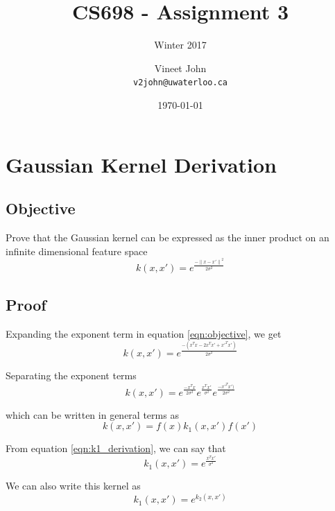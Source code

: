 \documentclass[parskip=full]{scrartcl}
\begin{document}
\title{CS698 - Assignment 3}
\subtitle{Winter 2017}
\author{
    Vineet John\\
    \texttt{v2john@uwaterloo.ca}
}
\date{\today}
\maketitle


\section{Gaussian Kernel Derivation} %
\label{sec:gaussian_kernel_derivation}

    \subsection*{Objective} %
    \label{sub:objective_1}
        Prove that the Gaussian kernel can be expressed as the inner product on an infinite dimensional feature space
        \begin{equation} \label{eqn:objective}
            k(x, x\prime) = e^{\frac{- {\lVert x - x\prime \rVert}^2}{2\sigma^2}}
        \end{equation}


    \subsection*{Proof} %
    \label{sub:proof_1}

        Expanding the exponent term in equation \ref{eqn:objective}, we get
        $$k(x, x\prime) = e^{\frac{-(x^Tx - 2x^Tx\prime + x\prime^Tx\prime)}{2\sigma^2}}$$

        Separating the exponent terms
        $$k(x, x\prime) = e^{\frac{-x^Tx}{2\sigma^2}} e^{\frac{x^Tx\prime}{\sigma^2}} e^{\frac{- x\prime^Tx\prime)}{2\sigma^2}}$$

        which can be written in general terms as
        \begin{equation} \label{eqn:k1_derivation}
            k(x, x\prime) = f(x) k_1(x, x\prime) f(x\prime)
        \end{equation}

        From equation \ref{eqn:k1_derivation}, we can say that
        $$k_1(x, x\prime) = e^{\frac{x^Tx\prime}{\sigma^2}} $$

        We can also write this kernel as 
        \begin{equation} \label{eqn:k2_derivation}
            k_1(x, x\prime) = e^{k_2(x, x\prime)}
        \end{equation}
\end{document}
